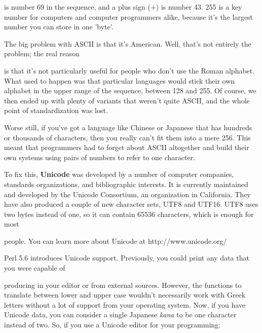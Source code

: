 \documentclass[a4paper,11pt]{book}
\begin{document}
\noindent is number 69 in the sequence, and a plus sign (+) is number 43. 255 is a key number for computers and computer programmers alike, because it's the largest number you can store in one 'byte'.

\noindent 

\noindent The big problem with ASCII is that it's American. Well, that's not entirely the problem; the real reason

\noindent is that it's not particularly useful for people who don't use the Roman alphabet. What used to happen was that particular languages would stick their own alphabet in the upper range of the sequence, between 128 and 255. Of course, we then ended up with plenty of variants that weren't quite ASCII, and the whole point of standardization was lost.

\noindent 

\noindent Worse still, if you've got a language like Chinese or Japanese that has hundreds or thousands of characters, then you really can't fit them into a mere 256. This meant that programmers had to forget about ASCII altogether and build their own systems using pairs of numbers to refer to one character.

\noindent 

\noindent To fix this, \textbf{Unicode }was developed by a number of computer companies, standards organizations, and bibliographic interests. It is currently maintained and developed by the Unicode Consortium, an organization in California. They have also produced a couple of new character sets, UTF8 and UTF16. UTF8 uses two bytes instead of one, so it can contain 65536 characters, which is enough for most

\noindent people. You can learn more about Unicode at http://www.unicode.org/

\noindent 

\noindent 

\noindent Perl 5.6 introduces Unicode support. Previously, you could print any data that you were capable of

\noindent producing in your editor or from external sources. However, the functions to translate between lower and upper case wouldn't necessarily work with Greek letters without a lot of support from your operating system. Now, if you have Unicode data, you can consider a single Japanese \textit{kana }to be one character instead of two. So, if you use a Unicode editor for your programming:

\noindent 
\end{document}
